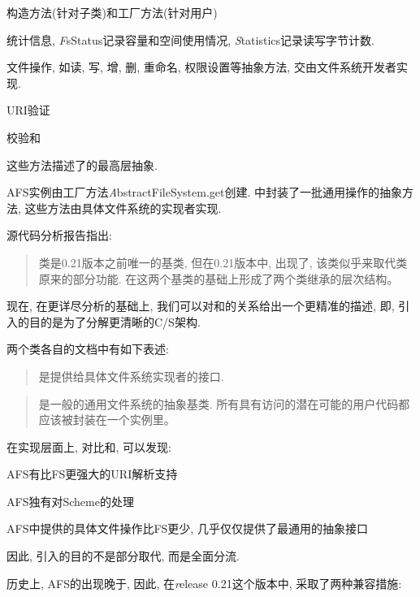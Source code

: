 \begin{XeItem}
    \item 构造方法(针对子类)和工厂方法(针对用户)
    \item 统计信息, {\emph FsStatus}记录容量和空间使用情况,
          {\emph Statistics}记录读写字节计数.
    \item 文件操作, 如读, 写, 增, 删, 重命名, 权限设置等抽象方法, 交由文件系统开发者实现.
    \item URI验证
    \item 校验和
\end{XeItem}

这些方法描述了{\HadoopFS}的最高层抽象.

AFS实例由工厂方法{\emph AbstractFileSystem.get}创建.
{\AFS}中封装了一批通用操作的抽象方法, 这些方法由具体文件系统的实现者实现.

{\emph \Hadoop 源代码分析报告}指出:

\begin{quote}
    {\FiS}类是0.21版本之前唯一的基类, 但在0.21版本中, 出现了{\AbsFS},
    该类似乎来取代{\FiS}类原来的部分功能. 在这两个基类的基础上形成了两个类继承的层次结构。
\end{quote}

现在, 在更详尽分析的基础上,
我们可以对{\FiS}和{\AFS}的关系给出一个更精准的描述,
即, 引入{\AFS}的目的是为了分解更清晰的C/S架构.

两个类各自的文档中有如下表述:

\begin{quote}
    {\AbsFS}是提供给具体文件系统实现者的接口.
\end{quote}

\begin{quote}
    {\FiS}是一般的通用文件系统的抽象基类.
    所有具有访问{\HDFS}的潜在可能的用户代码都应该被封装在一个{\FiS}实例里。
\end{quote}

在实现层面上, 对比{\AFS}和{\FS}, 可以发现:

\begin{XeItem}
    \item AFS有比FS更强大的URI解析支持
    \item AFS独有对Scheme的处理
    \item AFS中提供的具体文件操作比FS更少, 几乎仅仅提供了最通用的抽象接口
    \item 因此, 引入{\AbsFS}的目的不是部分取代, 而是全面分流.
\end{XeItem}

历史上, AFS的出现晚于{\FiS}, 因此, 在{\emph release 0.21}这个版本中,
采取了两种兼容措施:

